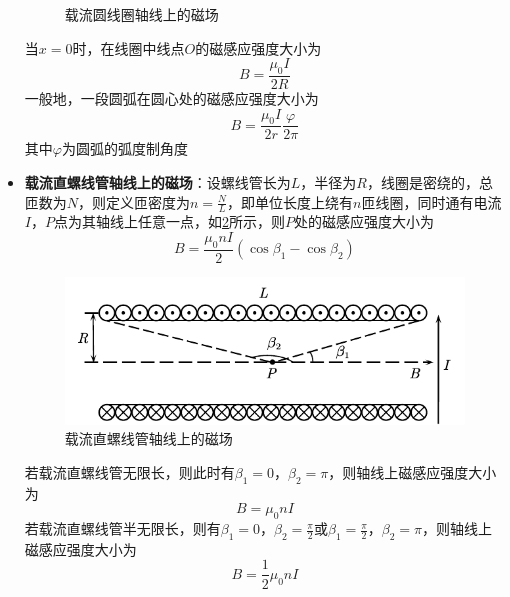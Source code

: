 \documentclass[12pt, a4paper, twoside]{ctexbook}
\begin{document}
\begin{itemize}
\begin{figure}[H]
        \caption{载流圆线圈轴线上的磁场}
        \label{fig:载流圆线圈轴线上的磁场}
    \end{figure}
    当$x=0$时，在线圈中线点$O$的磁感应强度大小为
    $$
    B=\frac{\mu_0 I}{2R}
    $$
    一般地，一段圆弧在圆心处的磁感应强度大小为
    $$
    B=\frac{\mu_0 I}{2r}\frac{\varphi}{2\pi}
    $$
    其中$\varphi$为圆弧的弧度制角度
    \item \textbf{载流直螺线管轴线上的磁场}：设螺线管长为$L$，半径为$R$，线圈是密绕的，总匝数为$N$，则定义匝密度为$n=\frac{N}{L}$，即单位长度上绕有$n$匝线圈，同时通有电流$I$，$P$点为其轴线上任意一点，如\textcolor{blue}{\cref{fig:载流直螺线管轴线上的磁场}}所示，则$P$处的磁感应强度大小为
    $$
    B=\frac{\mu_0nI}{2}\left(\cos\beta_1-\cos\beta_2\right)
    $$
    \begin{figure}[H]
        \centerline{\includegraphics[scale=1.0]{载流直螺线管轴线上的磁场.pdf}}
        \caption{载流直螺线管轴线上的磁场}
        \label{fig:载流直螺线管轴线上的磁场}
    \end{figure}
    若载流直螺线管无限长，则此时有$\beta_1=0$，$\beta_2=\pi$，则轴线上磁感应强度大小为
    $$
    B=\mu_0nI
    $$
    若载流直螺线管半无限长，则有$\beta_1=0$，$\beta_2=\frac{\pi}{2}$或$\beta_1=\frac{\pi}{2}$，$\beta_2=\pi$，则轴线上磁感应强度大小为
    $$
    B=\frac{1}{2}\mu_0nI
    $$
\end{itemize}
\end{document}
